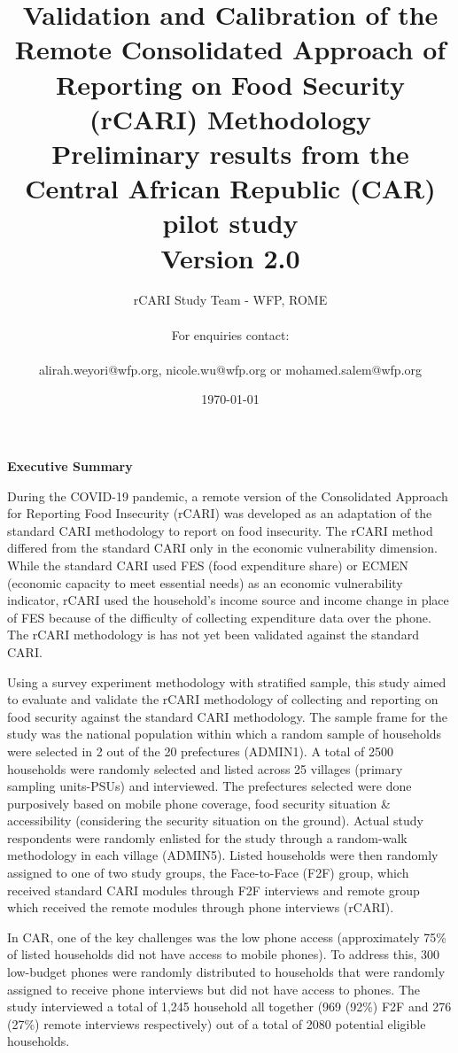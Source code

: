 \documentclass[11pt,harvard]{article}
\author{rCARI Study Team - WFP, ROME \\	\\For enquiries contact:\\		\\alirah.weyori@wfp.org, nicole.wu@wfp.org or mohamed.salem@wfp.org}
\date{\today}
\title{Validation and Calibration of the Remote Consolidated Approach of Reporting on Food Security (rCARI) Methodology 
	\\ {\normalsize Preliminary results from the Central African Republic (CAR) pilot study} 
	\\{\normalsize{Version 2.0}} }
\begin{document}
	\maketitle \vspace{-1cm}
	\onehalfspacing
	\pagebreak
	\setlength{\parskip}{6pt} %
	\tableofcontents
	\pagebreak

	
\textbf{Executive Summary}

During the COVID-19 pandemic, a remote version of the Consolidated Approach for Reporting Food Insecurity (rCARI) was developed as an adaptation of the standard CARI methodology to report on food insecurity. The rCARI method differed from the standard CARI only in the economic vulnerability dimension. While the standard CARI used FES (food expenditure share) or ECMEN (economic capacity to meet essential needs) as an economic vulnerability indicator, rCARI used the household’s income source and income change in place of FES because of the difficulty of collecting expenditure data over the phone. The rCARI methodology is has not yet been validated against the standard CARI. 

Using a survey experiment methodology with stratified sample, this study aimed to evaluate and validate the rCARI methodology of collecting and reporting on food security against the standard CARI methodology. The sample frame for the study was the national population within which a random sample of households were selected in 2 out of the 20 prefectures (ADMIN1). A total of 2500 households were randomly selected and listed across 25 villages (primary sampling units-PSUs) and interviewed. The prefectures selected were done purposively based on mobile phone coverage, food security situation \& accessibility (considering the security situation on the ground). Actual study respondents were randomly enlisted for the study through a random-walk methodology in each village (ADMIN5). Listed households were then randomly assigned to one of two study groups, the Face-to-Face (F2F) group, which received standard CARI modules through F2F interviews and remote group which received the remote modules through phone interviews (rCARI). 

In CAR, one of the key challenges was the low phone access (approximately 75\% of listed households did not have access to mobile phones). To address this, 300 low-budget phones were randomly distributed to households that were randomly assigned to receive phone interviews but did not have access to phones. The study interviewed a total of 1,245 household all together (969 (92\%) F2F and 276 (27\%) remote interviews respectively) out of a total of 2080 potential eligible households.
\end{document}
